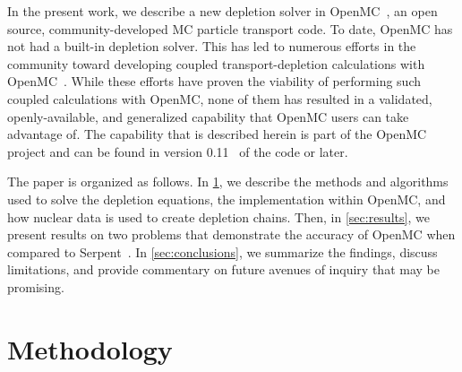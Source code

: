 \documentclass[3p,authoryear]{elsarticle}
\begin{document}
In the present work, we describe a new depletion solver in
OpenMC~\citep{romano2015ane1}, an open source, community-developed MC particle
transport code. To date, OpenMC has not had a built-in depletion solver. This
has led to numerous efforts in the community toward developing coupled
transport-depletion calculations with OpenMC~\citep{gul2017ane,
lanversin2017icone, lanversin2019phd, liu2019nst, zhuang2020pne, zhao2020ned,
zhao2020cpc, zhang2020ane}. While these efforts have proven the viability of
performing such coupled calculations with OpenMC, none of them has resulted in a
validated, openly-available, and generalized capability that OpenMC users can
take advantage of. The capability that is described herein is part of the OpenMC
project and can be found in version 0.11~\citep{openmc-0110} of the code or
later.

The paper is organized as follows. In \cref{sec:methods}, we describe the
methods and algorithms used to solve the depletion equations, the implementation
within OpenMC, and how nuclear data is used to create depletion chains. Then, in
\cref{sec:results}, we present results on two problems that demonstrate the
accuracy of OpenMC when compared to Serpent~\citep{leppanen2015ane}. In
\cref{sec:conclusions}, we summarize the findings, discuss limitations, and
provide commentary on future avenues of inquiry that may be promising.

\section{Methodology}
\label{sec:methods}
\end{document}
